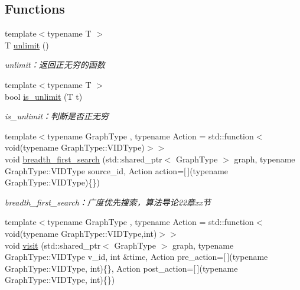 \subsection*{Functions}
\begin{DoxyCompactItemize}
\item 
{\footnotesize template$<$typename T $>$ }\\T \hyperlink{namespace_introduction_to_algorithm_1_1_graph_algorithm_a19237111c3b1ec2717c5e1aefe2f6d9b}{unlimit} ()
\begin{DoxyCompactList}\small\item\em unlimit：返回正无穷的函数 \end{DoxyCompactList}\item 
{\footnotesize template$<$typename T $>$ }\\bool \hyperlink{namespace_introduction_to_algorithm_1_1_graph_algorithm_a4f664c13605fc87ca8d26f4aad5a9fa2}{is\+\_\+unlimit} (T t)
\begin{DoxyCompactList}\small\item\em is\+\_\+unlimit：判断是否正无穷 \end{DoxyCompactList}\item 
{\footnotesize template$<$typename Graph\+Type , typename Action  = std\+::function$<$ void(typename Graph\+Type\+::\+V\+I\+D\+Type)$>$$>$ }\\void \hyperlink{namespace_introduction_to_algorithm_1_1_graph_algorithm_aa4b14f2da6462f3575a3f74b6558a575}{breadth\+\_\+first\+\_\+search} (std\+::shared\+\_\+ptr$<$ Graph\+Type $>$ graph, typename Graph\+Type\+::\+V\+I\+D\+Type source\+\_\+id, Action action=\mbox{[}$\,$\mbox{]}(typename Graph\+Type\+::\+V\+I\+D\+Type)\{\})
\begin{DoxyCompactList}\small\item\em breadth\+\_\+first\+\_\+search：广度优先搜索，算法导论22章xx节 \end{DoxyCompactList}\item 
{\footnotesize template$<$typename Graph\+Type , typename Action  = std\+::function$<$void(typename Graph\+Type\+::\+V\+I\+D\+Type,int)$>$$>$ }\\void \hyperlink{namespace_introduction_to_algorithm_1_1_graph_algorithm_a01ece18a63d13cfe023c1f6360e63451}{visit} (std\+::shared\+\_\+ptr$<$ Graph\+Type $>$ graph, typename Graph\+Type\+::\+V\+I\+D\+Type v\+\_\+id, int \&time, Action pre\+\_\+action=\mbox{[}$\,$\mbox{]}(typename Graph\+Type\+::\+V\+I\+D\+Type, int)\{\}, Action post\+\_\+action=\mbox{[}$\,$\mbox{]}(typename Graph\+Type\+::\+V\+I\+D\+Type, int)\{\})

\end{DoxyCompactItemize}

